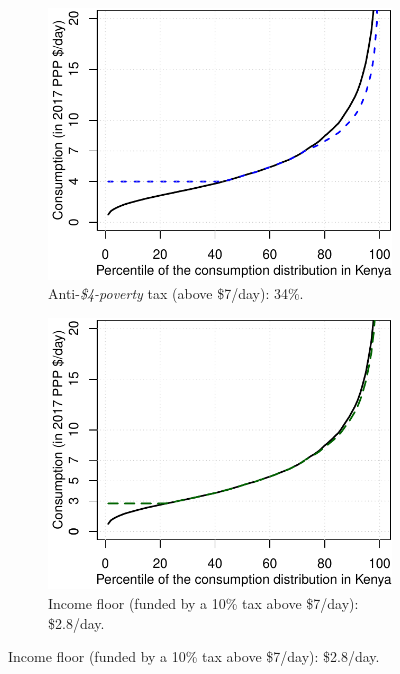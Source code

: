 \documentclass[12pt,english]{article}
\begin{document}
\begin{figure}[h!]
\begin{subfigure}{.5\textwidth}
  \end{subfigure}
  \\ \quad \\
  \begin{subfigure}{.5\textwidth}
    \caption[]{Anti-\textit{\$4-poverty} tax (above \$7/day): 34\%.}\label{fig:kenya_tax}
    \includegraphics[width=\textwidth]{../figures/Kenya_tax.pdf}
  \end{subfigure} \;
  \begin{subfigure}{.5\textwidth}
    \caption[]{Income floor (funded by a 10\% tax above \$7/day): \$2.8/day.}\label{fig:kenya_floor}
    \includegraphics[width=\textwidth]{../figures/Kenya_floor.pdf}
  \end{subfigure}
\end{figure}  
\end{document}
